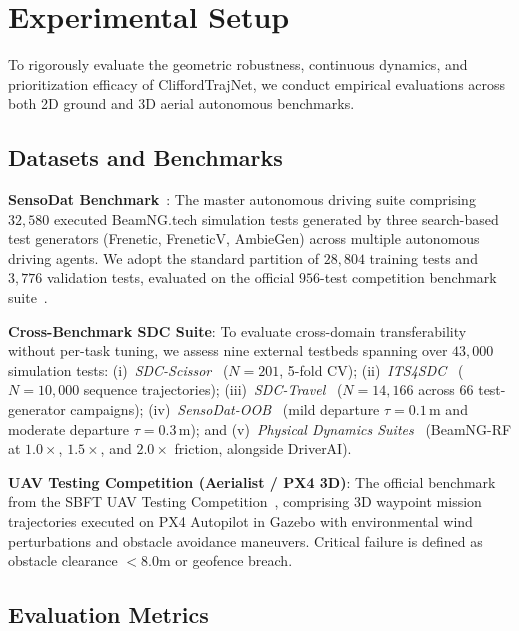 \section{Experimental Setup}
\label{sec:setup}

To rigorously evaluate the geometric robustness, continuous dynamics, and prioritization efficacy of CliffordTrajNet, we conduct empirical evaluations across both 2D ground and 3D aerial autonomous benchmarks.

\subsection{Datasets and Benchmarks}

\textbf{SensoDat Benchmark}~\cite{sensodat}: The master autonomous driving suite comprising $32{,}580$ executed BeamNG.tech simulation tests generated by three search-based test generators (Frenetic, FreneticV, AmbieGen) across multiple autonomous driving agents. We adopt the standard partition of $28{,}804$ training tests and $3{,}776$ validation tests, evaluated on the official $956$-test competition benchmark suite~\cite{roadfury}.

\textbf{Cross-Benchmark SDC Suite}: To evaluate cross-domain transferability without per-task tuning, we assess nine external testbeds spanning over $43{,}000$ simulation tests: (i)~\emph{SDC-Scissor}~\cite{sdcscissor} ($N=201$, 5-fold CV); (ii)~\emph{ITS4SDC}~\cite{its4sdc} ($N=10{,}000$ sequence trajectories); (iii)~\emph{SDC-Travel}~\cite{sdcprio} ($N=14{,}166$ across 66 test-generator campaigns); (iv)~\emph{SensoDat-OOB}~\cite{sensodat} (mild departure $\tau=0.1$\,m and moderate departure $\tau=0.3$\,m); and (v)~\emph{Physical Dynamics Suites}~\cite{sdcprio} (BeamNG-RF at $1.0\times$, $1.5\times$, and $2.0\times$ friction, alongside DriverAI).

\textbf{UAV Testing Competition (Aerialist / PX4 3D)}: The official benchmark from the SBFT UAV Testing Competition~\cite{uavcomp}, comprising 3D waypoint mission trajectories executed on PX4 Autopilot in Gazebo with environmental wind perturbations and obstacle avoidance maneuvers. Critical failure is defined as obstacle clearance $< 8.0$m or geofence breach.

\subsection{Evaluation Metrics}

